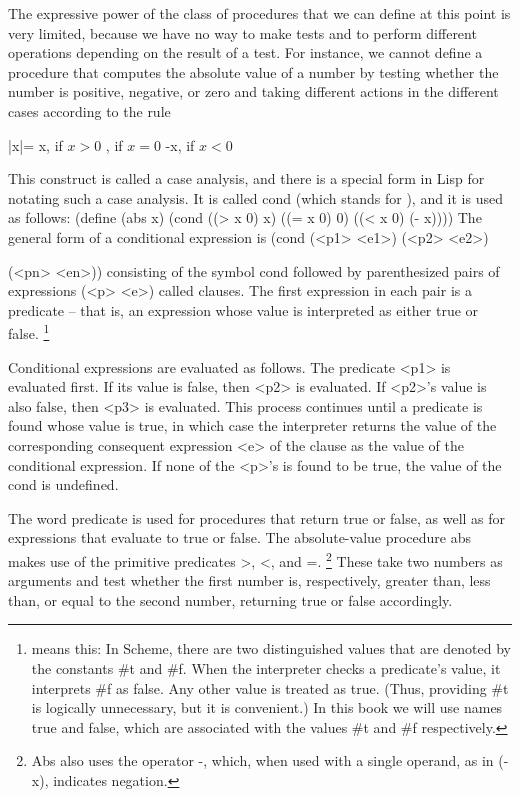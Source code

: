 The expressive power of the class of procedures that we can define at this point is very limited,
because we have no way to make tests and to perform different operations depending on the result of a test.
For instance,
we cannot define a procedure that computes the absolute value of a number
by testing whether the number is positive, negative, or zero
and taking different actions in the different cases according to the rule

\startformula
  |x|=\startmathcases
         \NC  x, \NC if $x>0$ \NR
         , \NC if $x=0$ \NR
         \NC -x, \NC if $x<0$ \NR
      \stopmathcases
\stopformula

This construct is called a case analysis,
and there is a special form in Lisp for notating such a case analysis.
It is called cond (which stands for ), and it is used as follows:
\startcode
(define (abs x)
  (cond ((> x 0) x)
        ((= x 0) 0)
        ((< x 0) (- x))))
\stopcode
The general form of a conditional expression is
\startcode
(cond (<p1> <e1>)
      (<p2> <e2>)

      (<pn> <en>))
\stopcode
consisting of the symbol cond followed by parenthesized pairs of expressions (<p> <e>) called clauses.
The first expression in each pair is a predicate
-- that is, an expression whose value is interpreted as either true or false.
\footnote{%
    means this:
   In Scheme, there are two distinguished values that are denoted by the constants \#t and \#f.
   When the interpreter checks a predicate's value,
   it interprets \#f as false. Any other value is treated as true.
   (Thus, providing \#t is logically unnecessary, but it is convenient.)
   In this book we will use names true and false,
   which are associated with the values \#t and \#f respectively.
}

Conditional expressions are evaluated as follows.
The predicate <p1> is evaluated first.
If its value is false, then <p2> is evaluated.
If <p2>'s value is also false, then <p3> is evaluated.
This process continues until a predicate is found whose value is true,
in which case the interpreter returns the value of the corresponding consequent expression <e> of the clause
as the value of the conditional expression.
If none of the <p>'s is found to be true, the value of the cond is undefined.

The word predicate is used for procedures that return true or false,
as well as for expressions that evaluate to true or false.
The absolute-value procedure abs makes use of the primitive predicates >, <, and =.
\footnote{%
   Abs also uses the  operator -,
   which,
   when used with a single operand, as in (- x),
   indicates negation.
}
 These take two numbers as arguments and test whether the first number is,
respectively, greater than, less than, or equal to the second number, returning true or false accordingly.


